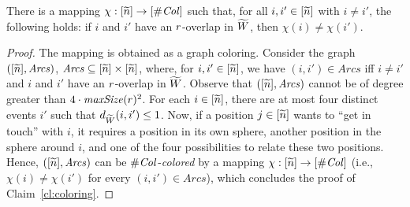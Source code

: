 \documentclass{LMCS}
\begin{document}
\begin{myclaim}\label{cl:coloring}
  There is a mapping $\chi: [\widetilde{n}] \rightarrow [\#\mathit{Col}]$ such that, for all
  $i,i' \in [\widetilde{n}]$ with $i \neq i'$, the following holds: if $i$ and $i'$ have
  an $r$-overlap in ${\widetilde{W}}$, then $\chi(i) \neq \chi(i')$.
\end{myclaim}

\begin{proof}
  The mapping is obtained as a graph coloring. Consider the graph
  $([\widetilde{n}],\mathit{Arcs})$, $\mathit{Arcs} \mathrel{\subseteq} [\widetilde{n}] \times
  [\widetilde{n}]$, where, for $i,i' \in [\widetilde{n}]$, we have $(i,i') \in \mathit{Arcs}$ iff
  $i \neq i'$ and $i$ and $i'$ have an $r$-overlap in ${\widetilde{W}}$. Observe
  that $([\widetilde{n}],\mathit{Arcs})$ cannot be of degree greater than $4 \cdot
  \mathit{maxSize}(r)^2$. For each $i \in [\widetilde{n}]$, there are at most four distinct events
  $i'$ such that $d_{\widetilde{W}}(i,i') \le 1$. Now, if a position $j \in [\widetilde{n}]$ wants
  to ``get in touch'' with $i$, it requires a position in its own sphere,
  another position in the sphere around $i$, and one of the four possibilities
  to relate these two positions. Hence, $([\widetilde{n}],\mathit{Arcs})$ can be
  $\#\mathit{Col}$-\emph{colored} by a mapping $\chi: [\widetilde{n}] \rightarrow [\#\mathit{Col}]$
  (i.e., $\chi(i) \neq \chi(i')$ for every $(i,i') \in \mathit{Arcs}$), which
  concludes the proof of Claim~\ref{cl:coloring}.
\end{proof}
\end{document}
